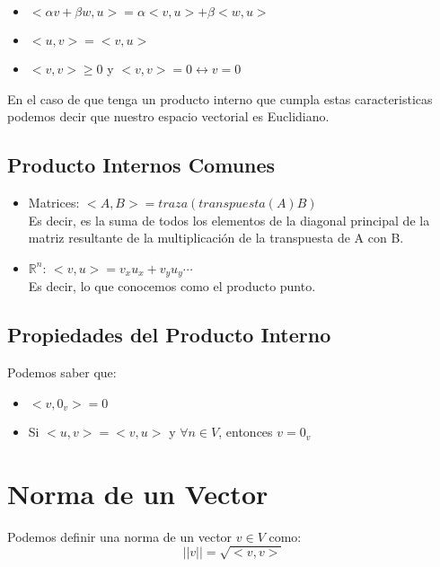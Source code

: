 \documentclass[12pt]{report}							    %
\begin{document}
        \begin{itemize}
            \item $<\alpha v + \beta w, u> = \alpha <v, u> + \beta <w, u>$
            \item $<u, v> = <v, u>$
            \item $<v, v> \geq 0 $ y $ <v, v> = 0 \leftrightarrow v = 0$
        \end{itemize}

        En el caso de que tenga un producto interno que cumpla estas caracteristicas
        podemos decir que nuestro espacio vectorial es Euclidiano.

        \subsection{Producto Internos Comunes}

        \begin{itemize}
            \item Matrices: $<A, B> = traza( transpuesta(A)B)$ \\ Es decir, es la suma de
            todos los elementos de la diagonal
            principal de la matriz resultante de la multiplicación de la transpuesta de A con B.

            \item $\mathbb{R}^n$: $<v, u> = v_x u_x + v_y u_y \cdots$ \\ Es decir, lo que
            conocemos como el producto punto. 
        \end{itemize}


        \subsection{Propiedades del Producto Interno}
        Podemos saber que:
        \begin{itemize}
            \item $<v, 0_v> = 0$
            \item Si $<u, v> = <v, u>$ y $\forall n \in V$, entonces $v = 0_v$
        \end{itemize}


    \clearpage
    \section{Norma de un Vector}
        Podemos definir una norma de un vector $v \in V$ como:
        \begin{equation}
            ||v|| = \sqrt{<v,v>}
        \end{equation}
\end{document}
